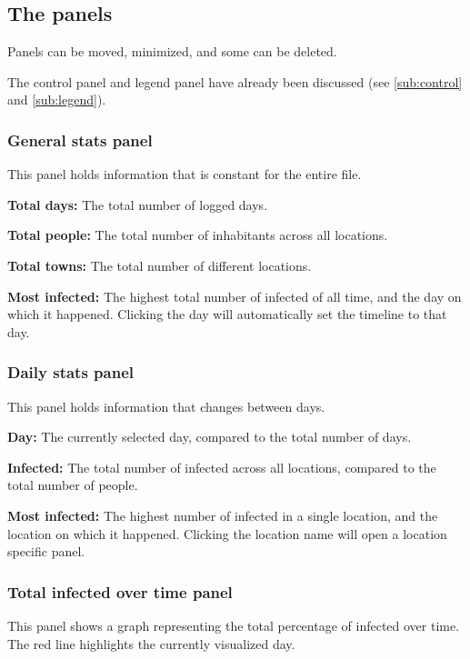 \subsection{The panels}

Panels can be moved, minimized, and some can be deleted.

The control panel and legend panel have already been discussed (see \ref{sub:control} and \ref{sub:legend}).

\subsubsection{General stats panel}
This panel holds information that is constant for the entire file.
\begin{compactitem}	
	\item \textbf{Total days:} The total number of logged days.
	\item \textbf{Total people:} The total number of inhabitants across all locations.
	\item \textbf{Total towns:} The total number of different locations.
	\item \textbf{Most infected:} The highest total number of infected of all time, and the day on which it happened. Clicking the day will automatically set the timeline to that day.
\end{compactitem}


\subsubsection{Daily stats panel}
This panel holds information that changes between days.
\begin{compactitem}	
	\item \textbf{Day:} The currently selected day, compared to the total number of days.
	\item \textbf{Infected:} The total number of infected across all locations, compared to the total number of people.
	\item \textbf{Most infected:} The highest number of infected in a single location, and the location on which it happened. Clicking the location name will open a location specific panel.
\end{compactitem}

\subsubsection{Total infected over time panel}
This panel shows a graph representing the total percentage of infected over time. The red line highlights the currently visualized day.

